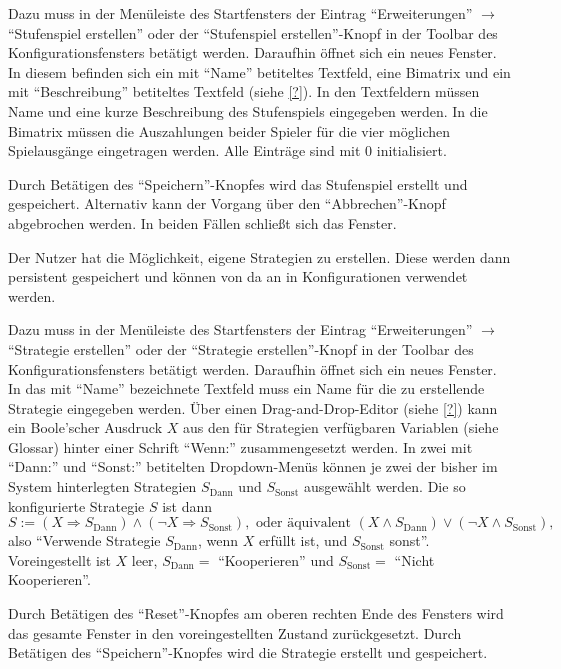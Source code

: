 \documentclass[parskip=full,11pt]{scrartcl}
\begin{document}
Dazu muss in der Menüleiste des Startfensters der Eintrag \enquote{Erweiterungen} \(\rightarrow\) \enquote{Stufenspiel erstellen} oder der \enquote{Stufenspiel erstellen}-Knopf in der Toolbar des Konfigurationsfensters betätigt werden. Daraufhin öffnet sich ein neues Fenster. In diesem befinden sich ein mit \enquote{Name} betiteltes Textfeld, eine Bimatrix und ein mit \enquote{Beschreibung} betiteltes Textfeld (siehe \cref{?}). In den Textfeldern müssen Name und eine kurze Beschreibung des Stufenspiels eingegeben werden. In die Bimatrix müssen die Auszahlungen beider Spieler für die vier möglichen Spielausgänge eingetragen werden. Alle Einträge sind mit \(0\) initialisiert.

Durch Betätigen des \enquote{Speichern}-Knopfes wird das Stufenspiel erstellt und gespeichert. Alternativ kann der Vorgang über den \enquote{Abbrechen}-Knopf abgebrochen werden. In beiden Fällen schließt sich das Fenster.

Der Nutzer hat die Möglichkeit, eigene Strategien zu erstellen. Diese werden dann persistent gespeichert und können von da an in Konfigurationen verwendet werden.

Dazu muss in der Menüleiste des Startfensters der Eintrag \enquote{Erweiterungen} \(\rightarrow\) \enquote{Strategie erstellen} oder der \enquote{Strategie erstellen}-Knopf in der Toolbar des Konfigurationsfensters betätigt werden. Daraufhin öffnet sich ein neues Fenster. In das mit \enquote{Name} bezeichnete Textfeld muss ein Name für die zu erstellende Strategie eingegeben werden. Über einen Drag-and-Drop-Editor (siehe \cref{?}) kann ein Boole'scher Ausdruck \(X\) aus den für Strategien verfügbaren Variablen (siehe Glossar) hinter einer Schrift \enquote{Wenn:} zusammengesetzt werden. In zwei mit \enquote{Dann:} und \enquote{Sonst:} betitelten Dropdown-Menüs können je zwei der bisher im System hinterlegten Strategien \(S_\text{Dann}\) und \(S_\text{Sonst}\) ausgewählt werden. Die so konfigurierte Strategie \(S\) ist dann
\[
S := (X \Rightarrow S_\text{Dann}) \land (\lnot X \Rightarrow S_\text{Sonst}), \text{ oder äquivalent } (X \land S_\text{Dann}) \lor (\lnot X \land S_\text{Sonst}),
\]
also \enquote{Verwende Strategie \(S_\text{Dann}\), wenn \(X\) erfüllt ist, und \(S_\text{Sonst}\) sonst}. Voreingestellt ist \(X\) leer, \(S_\text{Dann} =\) \enquote{Kooperieren} und \(S_\text{Sonst} =\) \enquote{Nicht Kooperieren}.

Durch Betätigen des \enquote{Reset}-Knopfes am oberen rechten Ende des Fensters wird das gesamte Fenster in den voreingestellten Zustand zurückgesetzt. Durch Betätigen des \enquote{Speichern}-Knopfes wird die Strategie erstellt und gespeichert.
\end{document}
